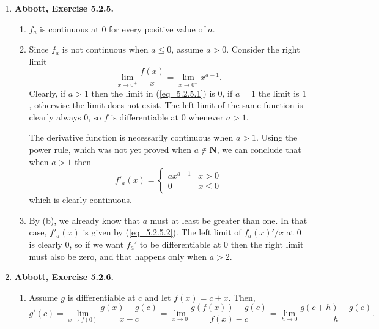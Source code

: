 \documentclass{article}
\newcommand{\N}{\mathbf{N}}
\newcommand{\exc}[2][Abbott]{\item \textbf{#1, Exercise #2.}}
\begin{document}
\begin{enumerate}
    \exc{5.2.5}
    \begin{enumerate}
        \item $f_a$ is continuous at $0$ for every positive value of $a$.
        
        \item Since $f_a$ is not continuous when $a \leq 0$, assume $a > 0$. Consider the right limit 
        \begin{equation} \label{eq_5.2.5.1}
            \lim_{x \to 0^+} \frac{f(x)}{x} = \lim_{x \to 0^+} x^{a-1}.
        \end{equation} Clearly, if $a > 1$ then the limit in (\ref{eq_5.2.5.1}) is $0$, if $a = 1$ the limit is $1$, otherwise the limit does not exist. The left limit of the same function is clearly always $0$, so $f$ is differentiable at $0$ whenever $a > 1$.
        
        The derivative function is necessarily continuous when $a > 1$. Using the power rule, which was not yet proved when $a \notin \N$, we can conclude that when $a > 1$ then
        \begin{equation} \label{eq_5.2.5.2}
            f'_a(x) = \begin{cases}
                a x^{a-1} & x > 0 \\ 
                0 & x \leq 0
            \end{cases}
        \end{equation} which is clearly continuous.
        
        \item By (b), we already know that $a$ must at least be greater than one. In that case, $f'_a(x)$ is given by (\ref{eq_5.2.5.2}). The left limit of $f_a(x)'/x$ at $0$ is clearly $0$, so if we want $f_a'$ to be differentiable at $0$ then the right limit must also be zero, and that happens only when $a > 2$.
    \end{enumerate}
    
    \exc{5.2.6}
    \begin{enumerate}
        \item Assume $g$ is differentiable at $c$ and let $f(x) = c + x$. Then,
        \begin{equation*}
            g'(c) = \lim_{x \to f(0)} \frac{g(x)-g(c)}{x-c} = \lim_{x \to 0} \frac{g(f(x))-g(c)}{f(x)-c} = \lim_{h \to 0}\frac{g(c+h) - g(c)}{h}.
        \end{equation*}
        

\end{enumerate}
\end{enumerate}
\end{document}
